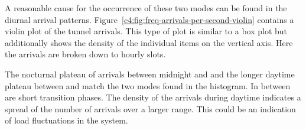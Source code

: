 A reasonable cause for the occurrence of these two modes can be found in the diurnal arrival patterns. Figure~\ref{c4:fig:freq-arrivals-per-second-violin} contains a violin plot of the tunnel arrivals. This type of plot is similar to a box plot but additionally shows the density of the individual items on the vertical axis. Here the arrivals are broken down to hourly slots. 

The nocturnal plateau of arrivals between midnight and  and the longer daytime plateau between  and  match the two modes found in the histogram. In between are short transition phases. The density of the arrivals during daytime indicates a spread of the number of arrivals over a larger range. This could be an indication of load fluctuations in the system.

